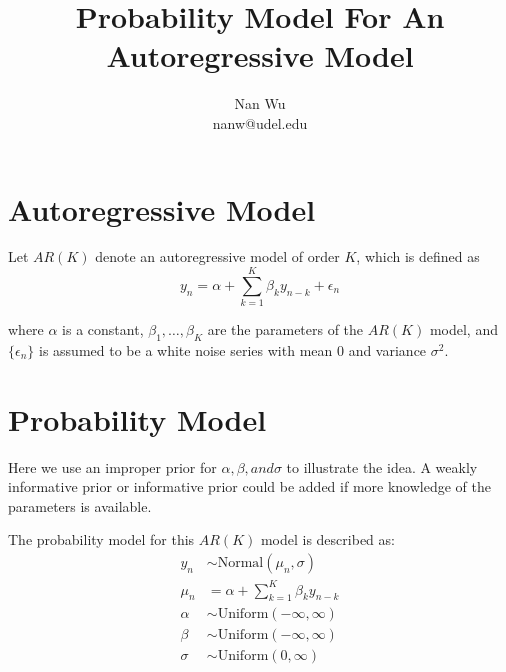 \documentclass[12pt]{article}
\begin{document}
\title{Probability Model For An Autoregressive Model}
\author{Nan Wu \\ nanw@udel.edu}
\date{}
\maketitle

\section{Autoregressive Model}

Let $AR(K)$ denote an autoregressive model of order $K$, which is defined as
\begin{equation}
y_n = \alpha + \sum \limits_{k=1}^K \beta_k y_{n-k} + \epsilon_n
\end{equation}

where $\alpha$ is a constant, $\beta_1, \ldots, \beta_K$ are the parameters of the $AR(K)$ model, and $\{\epsilon_n\}$ is assumed to be a white noise series with mean $0$ and variance $\sigma^2$.

\section{Probability Model}

Here we use an improper prior for $\alpha, \beta, and \sigma$ to illustrate the idea. A weakly informative prior or informative prior could be added if more knowledge of the parameters is available.

The probability model for this $AR(K)$ model is described as:
\begin{align*}
y_n &\sim \mathrm{Normal}\left( \mu_n, \sigma \right) \\
\mu_n &= \alpha + \sum \limits_{k=1}^K \beta_k y_{n-k} \\
\alpha &\sim \mathrm{Uniform}\left( -\infty,\infty \right) \\
\beta &\sim \mathrm{Uniform}\left( -\infty,\infty \right) \\
\sigma &\sim \mathrm{Uniform}\left( 0,\infty \right)
\end{align*}
\end{document}
